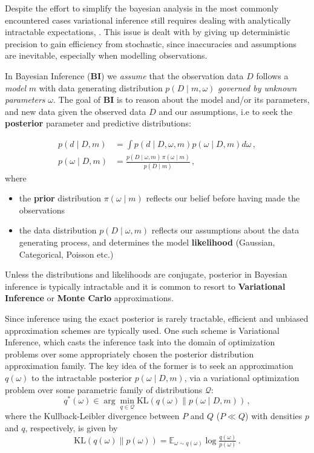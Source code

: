 \documentclass[a4paper,10pt]{article}
\begin{document}
Despite the effort to simplify the bayesian analysis in the most commonly encountered cases
variational inference still requires dealing with analytically intractable expectations,
\cite{citation_needed}. This issue is dealt with by giving up deterministic precision to
gain efficiency from stochastic, since inaccuracies and assumptions are inevitable, especially
when modelling observations.

In Bayesian Inference (\textbf{BI}) we \textit{assume} that the observation data $D$ follows a
\textit{model} $m$ with data generating distribution $p(D \mid m, \omega)$ \textit{governed by
unknown parameters} $\omega$. The goal of \textbf{BI} is to reason about the model and/or its
parameters, and new data given the observed data $D$ and our assumptions, i.e to seek the
\textbf{posterior} parameter and predictive distributions:

\begin{align}
p(d \mid D, m)
  &
  = \int p(d \mid D, \omega, m) p(\omega \mid D, m) d\omega
  \,, \\
p(\omega \mid D, m)
  &
  = \frac{p(D \mid \omega, m) \, \pi(\omega \mid m)}{p(D \mid m)}
  \,,
\end{align}
where
\begin{itemize}
  \item the \textbf{prior} distribution $\pi(\omega \mid m)$ reflects our belief before
  having made the observations
  \item the data distribution $p(D \mid \omega, m)$ reflects our assumptions about the data
  generating process, and determines the model \textbf{likelihood} (Gaussian, Categorical,
  Poisson etc.)
\end{itemize}
Unless the distributions and likelihoods are conjugate, posterior in Bayesian inference is
typically intractable and it is common to resort to \textbf{Variational Inference} or
\textbf{Monte Carlo} approximations.

Since inference using the exact posterior is rarely tractable, efficient and unbiased approximation
schemes are typically used. One such scheme is Variational Inference, which casts the inference
task into the domain of optimization problems over some appropriately chosen the posterior
distribution approximation family. The key idea of the former is to seek an approximation
$q(\omega)$ to the intractable posterior $p(\omega \mid D, m)$, via a variational optimization
problem over some parametric family of distributions $\mathcal{Q}$:
$$
q^*(\omega)
    \in \arg \min_{q\in \mathcal{Q}}
      \mathrm{KL}(q(\omega) \| p(\omega \mid D, m))
  \,, $$
where the Kullback-Leibler divergence between $P$ and $Q$ ($P\ll Q$) with densities $p$ and $q$,
respectively, is given by
$$
\mathrm{KL}(q(\omega) \| p(\omega))
  = \mathbb{E}_{\omega \sim q(\omega)}
    \log \tfrac{q(\omega)}{p(\omega)}
  \,.
  $$
\end{document}
